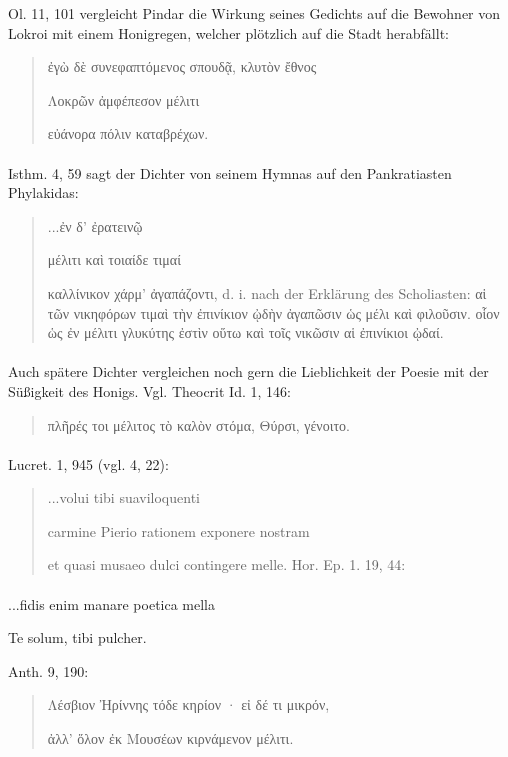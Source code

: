 \documentclass[a4paper, 11pt, oneside]{article}
\begin{document}
Ol. 11, 101 vergleicht Pindar die Wirkung seines Gedichts auf die Bewohner von Lokroi mit einem Honigregen, welcher plötzlich auf die Stadt herabfällt:
\begin{quotation}
ἐγὼ δὲ συνεφαπτόμενος σπουδᾷ, κλυτὸν ἔθνος

Λοκρῶν ἀμφέπεσον μέλιτι

εὐάνορα πόλιν καταβρέχων.
\end{quotation}
\paragraph{}
Isthm. 4, 59 sagt der Dichter von seinem Hymnas auf den Pankratiasten Phylakidas:
\begin{quotation}
...ἐν δ' ἐρατεινῷ

μέλιτι καὶ τοιαίδε τιμαί

καλλίνικον χάρμ' ἀγαπάζοντι, d. i. nach der Erklärung des Scholiasten: αἱ τῶν νικηφόρων τιμαὶ τὴν ἐπινίκιον ᾠδὴν ἀγαπῶσιν ὡς μέλι καὶ φιλοῦσιν. οἷον ὡς ἐν μέλιτι γλυκύτης ἐστὶν οὕτω καὶ τοῖς νικῶσιν αἱ ἐπινίκιοι ᾠδαί.
\end{quotation}
\paragraph{}
Auch spätere Dichter vergleichen noch gern die Lieblichkeit der Poesie mit der Süßigkeit des Honigs. Vgl. Theocrit Id. 1, 146:
\begin{quotation}
πλῆρές τοι μέλιτος τὸ καλὸν στόμα, Θύρσι, γένοιτο.
\end{quotation}
\paragraph{}
Lucret. 1, 945 (vgl. 4, 22):
\begin{quotation}
...volui tibi suaviloquenti

carmine Pierio rationem exponere nostram

et quasi musaeo dulci contingere melle. 
Hor. Ep. 1. 19, 44:
\end{quotation}
\paragraph{}
...fidis enim manare poetica mella

Te solum, tibi pulcher.

Anth. 9, 190:
\begin{quotation}
Λέσβιον Ἠρίννης τόδε κηρίον · εἰ δέ τι μικρόν,

ἀλλ' ὅλον ἐκ Μουσέων κιρνάμενον μέλιτι.
\end{quotation}
\end{document}
